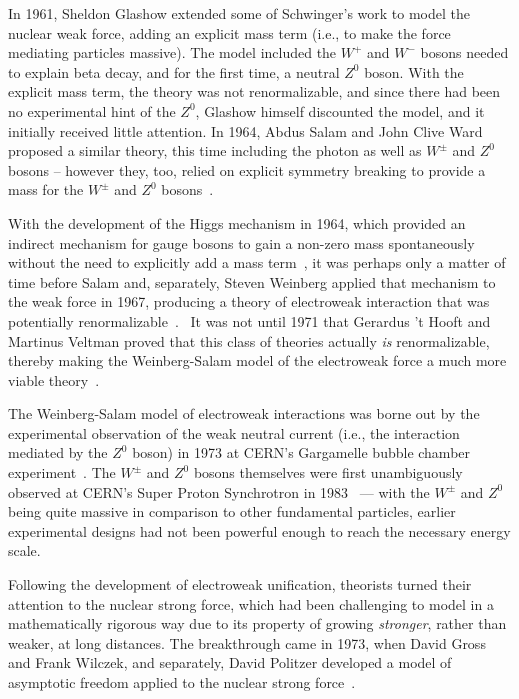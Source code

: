 In 1961, Sheldon Glashow extended some of Schwinger's work to model the nuclear weak force,  adding an explicit mass term (i.e., to make the force mediating particles massive).  The model included the $W^+$ and $W^-$ bosons needed to explain beta decay, and for the first time, a neutral $Z^0$ boson.  With the explicit mass term, the theory was not renormalizable, and since there had been no experimental hint of the $Z^0$, Glashow himself discounted the model, and it initially received little attention.  In 1964, Abdus Salam and John Clive Ward proposed a similar theory, this time including the photon as well as $W^\pm$ and $Z^0$ bosons -- however they, too, relied on explicit symmetry breaking to provide a mass for the $W^\pm$ and $Z^0$ bosons~\cite{Glashow1959,Glashow1961,SalamWard1964}.


With the development of the Higgs mechanism in 1964, which provided an indirect mechanism for gauge bosons to gain a non-zero mass spontaneously without the need to explicitly add a mass term~\cite{Higgs1964EnglertBrout,Higgs1964Higgs,Higgs1964GuralnikHagenKibble,BroutEnglertArXiv,guralnik2009}, it was perhaps only a matter of time before Salam and, separately, Steven Weinberg applied that mechanism to the weak force in 1967, producing a theory of electroweak interaction that was potentially renormalizable~\cite{Weinberg1967,salam1968}.~  It was not until 1971 that Gerardus 't Hooft and Martinus Veltman proved that this class of theories actually \emph{is} renormalizable, thereby making the Weinberg-Salam model of the electroweak force a much more viable theory~\cite{thooftveltman1972}.

The Weinberg-Salam model of electroweak interactions was borne out by the experimental observation of the weak neutral current (i.e., the interaction mediated by the $Z^0$ boson) in 1973 at CERN's Gargamelle bubble chamber experiment~\cite{gargamelle}.  The $W^\pm$ and $Z^0$ bosons themselves were first unambiguously observed at CERN's Super Proton Synchrotron in 1983~\cite{UA1W,UA2W,UA1Z,UA2Z} --- with the $W^\pm$ and $Z^0$ being quite massive in comparison to other fundamental particles, earlier experimental designs had not been powerful enough to reach the necessary energy scale.   

Following the development of electroweak unification, 
theorists turned their attention to the nuclear strong force, which had been challenging to model in a mathematically rigorous way due to its property of growing \emph{stronger}, rather than weaker, at long distances.  The breakthrough came in 1973, when David Gross and Frank Wilczek, and separately, David Politzer developed a model of asymptotic freedom applied to the nuclear strong force~\cite{gross1973asymptotically,gross1973ultraviolet,politzer1973reliable}.  

